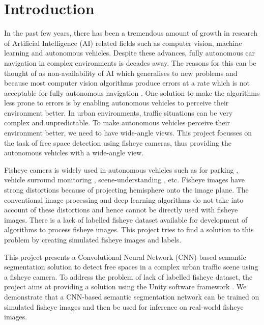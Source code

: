 \documentclass[a4paper, 12pt, oneside, BCOR1cm,toc=chapterentrywithdots]{scrbook}
\begin{document}
\onecolumn

\chapter{Introduction}
In the past few years, there has been a tremendous amount of growth in research of Artificial Intelligence (AI) related fields such as computer vision, machine learning and autonomous vehicles. Despite these advances, fully autonomous car navigation in complex environments is decades away. The reasons for this can be thought of as non-availability of AI which generalises to new problems and because most computer vision algorithms produce errors at a rate which is not acceptable for fully autonomous navigation \cite{janai2017computer}. One solution to make the algorithms less prone to errors is by enabling autonomous vehicles to perceive their environment better. In urban environments, traffic situations can be very complex and unpredictable. To make autonomous vehicles perceive their environment better, we need to have wide-angle views. This project focusses on the task of free space detection using fisheye cameras, thus providing the autonomous vehicles with a wide-angle view. 

Fisheye camera is widely used in autonomous vehicles such as for parking \cite{wang2014automatic}, vehicle surround monitoring \cite{liu2008bird}, scene-understanding \cite{haltakov2012scene}, etc. Fisheye images have strong distortions because of projecting hemisphere onto the image plane. The conventional image processing and deep learning algorithms do not take into account of these distortions and hence cannot be directly used with fisheye images. There is a lack of labelled fisheye dataset available for development of algorithms to process fisheye images. This project tries to find a solution to this problem by creating simulated fisheye images and labels. 

This project presents a Convolutional Neural Network (CNN)-based semantic segmentation solution to detect free spaces in a complex urban traffic scene using a fisheye camera. To address the problem of lack of labelled fisheye dataset, the project aims at providing a solution using the Unity software framework \cite{unity3d}. We demonstrate that a CNN-based semantic segmentation network can be trained on simulated fisheye images and then be used for inference on real-world fisheye images. 
\end{document}
